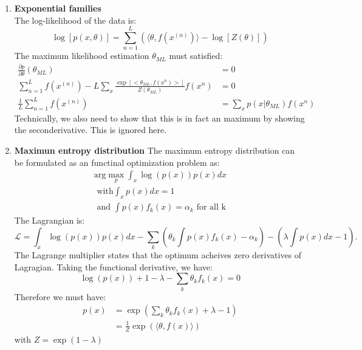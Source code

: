 \documentclass{article}
\begin{document}
\begin{enumerate}
\pagebreak
\item \textbf{Exponential families}
\\
The log-likelihood of the data is:
\begin{equation}
\log [p(x, \theta)] = \sum_{n=1}^{L}( \langle \theta, f(x^{(n)}) \rangle - \log[Z(\theta)])
\end{equation}
The maximum likelihood estimation $\theta_{ML}$ must satisfied:
\begin{align}
\frac{\partial p}{ \partial \theta} (\theta_{ML}) &= 0 \\
\sum_{n=1}^{L}f(x^{(n)}) - L\sum_{x} \frac{\exp[<\theta_{ML}, f(x^{n})>] }{Z(\theta_{ML})} f(x^n) &= 0\\
\frac{1}{L} \sum_{n=1}^{L}f(x^{(n)})  &= \sum_{x} p(x | \theta_{ML}) f(x^{n})
\end{align}
Technically, we also need to show that this is in fact an maximum by showing the seconderivative. This is ignored here.
\pagebreak
\item \textbf{Maximun entropy distribution}
The maximum entropy distribution can be formulated as an functinal optimization problem as:
\begin{align*}
\text{arg} \max_{p} \int_x \log(p(x)) p(x) dx \\ 
\text{  with} \int_{x} p(x) dx=1\\
 \text{ and } \int p(x) f_k(x) = \alpha_k \text{  for all k}
\end{align*}
The Lagrangian is:
\begin{equation}
\mathcal{L} = \int_x \log(p(x)) p(x) dx - \sum_{k} (\theta_k \int p(x) f_k(x)  - \alpha_k) - (\lambda \int p(x)dx -1).
\end{equation}
The Lagrange multiplier states that the optimum acheives zero derivatives of Lagragian. Taking the functional derivative, we have:
\begin{equation}
\log (p(x) ) + 1 - \lambda - \sum_{k} \theta_k f_k(x) = 0
\end{equation}
Therefore we must have:
\begin{align}
p(x) &= \exp (\sum_{k} \theta_k f_k(x) + \lambda - 1)\\
&=\frac{1}{Z} \exp (\langle \theta, f(x) \rangle)
\end{align}
with $Z = \exp(1-\lambda)$
\end{enumerate}

%
%
\end{document}

